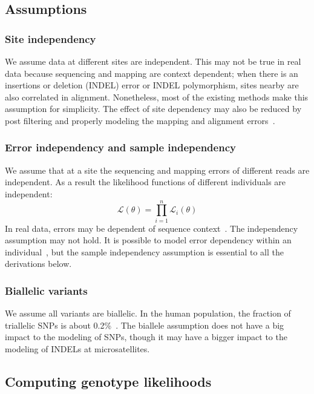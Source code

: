 \documentclass{bioinfo}
\begin{document}
\begin{methods}
\subsection{Assumptions}

\subsubsection{Site independency} We assume data at different sites are
independent.  This may not be true in real data because sequencing and mapping
are context dependent; when there is an insertions or deletion (INDEL) error or
INDEL polymorphism, sites nearby are also correlated in alignment. Nonetheless,
most of the existing methods make this assumption for simplicity. The effect
of site dependency may also be reduced by post filtering and properly modeling
the mapping and alignment errors~\citep{Li:2008zr,Li:2011kx}.

\subsubsection{Error independency and sample independency}
We assume that at a site the sequencing and mapping errors of different reads
are independent. As a result the likelihood functions of different individuals
are independent:
\begin{equation}
\mathcal{L}(\theta)=\prod_{i=1}^n\mathcal{L}_i(\theta)
\end{equation}
In real data, errors may be dependent of sequence
context~\citep{Nakamura:2011kx}. The independency assumption may not hold. It
is possible to model error dependency within an individual~\citep{Li:2008zr},
but the sample independency assumption is essential to all the derivations
below.

\subsubsection{Biallelic variants}
We assume all variants are biallelic. In the human population, the fraction of
triallelic SNPs is about 0.2\%~\citep{Hodgkinson:2010uq}. The biallele assumption
does not have a big impact to the modeling of SNPs, though it may have a bigger
impact to the modeling of INDELs at microsatellites.

\subsection{Computing genotype likelihoods}


\end{methods}
\end{document}
